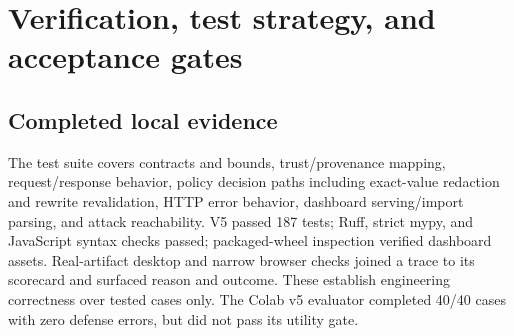\documentclass[11pt,a4paper]{article}
\begin{document}
\section{Verification, test strategy, and acceptance gates}
\subsection{Completed local evidence}
The test suite covers contracts and bounds, trust/provenance mapping, request/response behavior, policy decision paths including exact-value redaction and rewrite revalidation, HTTP error behavior, dashboard serving/import parsing, and attack reachability. V5 passed 187 tests; Ruff, strict mypy, and JavaScript syntax checks passed; packaged-wheel inspection verified dashboard assets. Real-artifact desktop and narrow browser checks joined a trace to its scorecard and surfaced reason and outcome. These establish engineering correctness over tested cases only. The Colab v5 evaluator completed 40/40 cases with zero defense errors, but did not pass its utility gate.

\newpage
\end{document}
